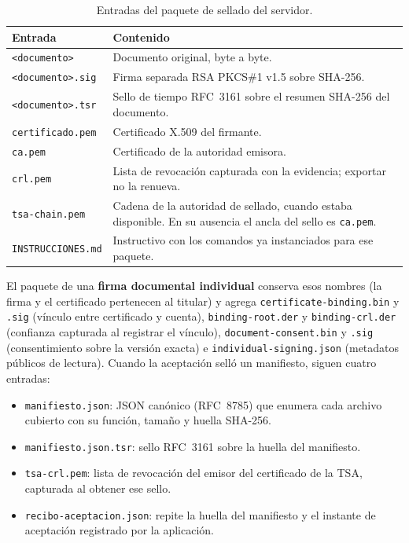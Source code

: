 \begin{table}[H]
  \centering
  \caption{Entradas del paquete de sellado del servidor.}
  \label{tab:ver-contenido}
  \begin{tabularx}{\textwidth}{L{4.3cm} Y}
    \toprule
    \textbf{Entrada} & \textbf{Contenido} \\
    \midrule
    \texttt{<documento>} & Documento original, byte a byte. \\
    \texttt{<documento>.sig} & Firma separada RSA PKCS\#1 v1.5 sobre
      SHA-256. \\
    \texttt{<documento>.tsr} & Sello de tiempo RFC~3161 sobre el resumen
      SHA-256 del documento. \\
    \texttt{certificado.pem} & Certificado X.509 del firmante. \\
    \texttt{ca.pem} & Certificado de la autoridad emisora. \\
    \texttt{crl.pem} & Lista de revocación capturada con la evidencia;
      exportar no la renueva. \\
    \texttt{tsa-chain.pem} & Cadena de la autoridad de sellado, cuando
      estaba disponible. En su ausencia el ancla del sello es
      \texttt{ca.pem}. \\
    \texttt{INSTRUCCIONES.md} & Instructivo con los comandos ya
      instanciados para ese paquete. \\
    \bottomrule
  \end{tabularx}
\end{table}

El paquete de una \textbf{firma documental individual} conserva esos
nombres (la firma y el certificado pertenecen al titular) y agrega
\texttt{certificate-binding.bin} y \texttt{.sig} (vínculo entre
certificado y cuenta), \texttt{binding-root.der} y
\texttt{binding-crl.der} (confianza capturada al registrar el vínculo),
\texttt{document-consent.bin} y \texttt{.sig} (consentimiento sobre la
versión exacta) e \texttt{individual-signing.json} (metadatos públicos de
lectura). Cuando la aceptación selló un manifiesto, siguen cuatro entradas:

\begin{itemize}
  \item \texttt{manifiesto.json}: JSON canónico (RFC~8785) que enumera
        cada archivo cubierto con su función, tamaño y huella SHA-256.
  \item \texttt{manifiesto.json.tsr}: sello RFC~3161 sobre la huella del
        manifiesto.
  \item \texttt{tsa-crl.pem}: lista de revocación del emisor del
        certificado de la TSA, capturada al obtener ese sello.
  \item \texttt{recibo-aceptacion.json}: repite la huella del manifiesto
        y el instante de aceptación registrado por la aplicación.
\end{itemize}


